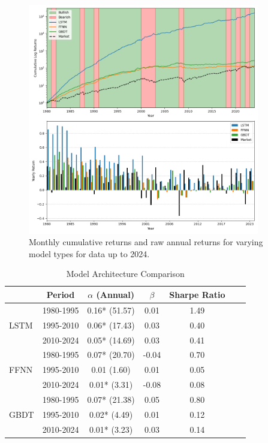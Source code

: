\documentclass{article}
\begin{document}
\newpage

\begin{figure}[H]
    \centering
    \includegraphics[width=0.9\textwidth]{2024_plot1_model_comparison.png}
    \caption{Monthly cumulative returns and raw annual returns for varying model types for data up to 2024.}
    \label{fig:model_comp}
\end{figure}

\begin{table}[h]
    \centering
    \begin{tabular}{lcccccc}
        \toprule
        & Period & $\alpha$ (Annual) & $\beta$ & Sharpe Ratio \\
        \midrule
        \multirow{3}{*}{LSTM} & 1980-1995 & 0.16* (51.57) & 0.01 & 1.49 \\
                              & 1995-2010 & 0.06* (17.43) & 0.03 & 0.40 \\
                              & 2010-2024 & 0.05* (14.69) & 0.03 & 0.41 \\
        \midrule
        \multirow{3}{*}{FFNN} & 1980-1995 & 0.07* (20.70) & -0.04 & 0.70 \\
                              & 1995-2010 & 0.01 (1.60) & 0.01 & 0.05 \\
                              & 2010-2024 & 0.01* (3.31) & -0.08 & 0.08 \\
        \midrule
        \multirow{3}{*}{GBDT} & 1980-1995 & 0.07* (21.38) & 0.05 & 0.80 \\
                              & 1995-2010 & 0.02* (4.49) & 0.01 & 0.12 \\
                              & 2010-2024 & 0.01* (3.23) & 0.03 & 0.14 \\
        \bottomrule
    \end{tabular}
    \caption{Model Architecture Comparison}
    \label{tab:model_comp}
\end{table}
\end{document}
